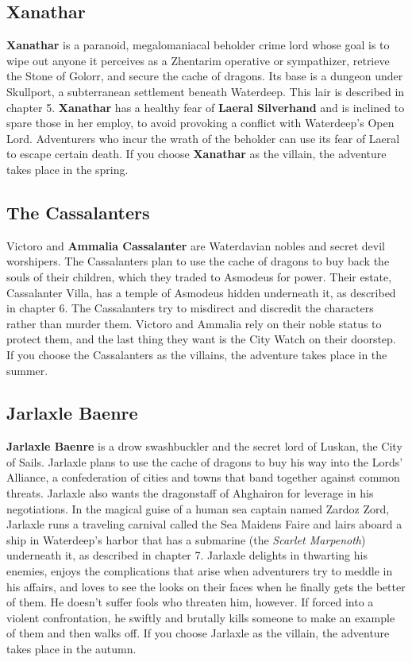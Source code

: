 \documentclass[10pt,a4paper,twoside,twocolumn,openany,nodeprecatedcode]{dndbook}
\begin{document}
\subsection{Xanathar}
\textbf{Xanathar} is a paranoid, megalomaniacal beholder crime lord whose goal is to wipe out anyone it perceives as a Zhentarim operative or sympathizer, retrieve the Stone of Golorr, and secure the cache of dragons. Its base is a dungeon under Skullport, a subterranean settlement beneath Waterdeep. This lair is described in chapter 5.
\textbf{Xanathar} has a healthy fear of \textbf{Laeral Silverhand} and is inclined to spare those in her employ, to avoid provoking a conflict with Waterdeep's Open Lord. Adventurers who incur the wrath of the beholder can use its fear of Laeral to escape certain death.
If you choose \textbf{Xanathar} as the villain, the adventure takes place in the spring.
\subsection{The Cassalanters}
Victoro and \textbf{Ammalia Cassalanter} are Waterdavian nobles and secret devil worshipers. The Cassalanters plan to use the cache of dragons to buy back the souls of their children, which they traded to Asmodeus for power. Their estate, Cassalanter Villa, has a temple of Asmodeus hidden underneath it, as described in chapter 6.
The Cassalanters try to misdirect and discredit the characters rather than murder them. Victoro and Ammalia rely on their noble status to protect them, and the last thing they want is the City Watch on their doorstep.
If you choose the Cassalanters as the villains, the adventure takes place in the summer.
\subsection{Jarlaxle Baenre}
\textbf{Jarlaxle Baenre} is a drow swashbuckler and the secret lord of Luskan, the City of Sails. Jarlaxle plans to use the cache of dragons to buy his way into the Lords' Alliance, a confederation of cities and towns that band together against common threats. Jarlaxle also wants the dragonstaff of Ahghairon for leverage in his negotiations. In the magical guise of a human sea captain named Zardoz Zord, Jarlaxle runs a traveling carnival called the Sea Maidens Faire and lairs aboard a ship in Waterdeep's harbor that has a submarine (the \textit{Scarlet Marpenoth}) underneath it, as described in chapter 7.
Jarlaxle delights in thwarting his enemies, enjoys the complications that arise when adventurers try to meddle in his affairs, and loves to see the looks on their faces when he finally gets the better of them. He doesn't suffer fools who threaten him, however. If forced into a violent confrontation, he swiftly and brutally kills someone to make an example of them and then walks off.
If you choose Jarlaxle as the villain, the adventure takes place in the autumn.
\end{document}
